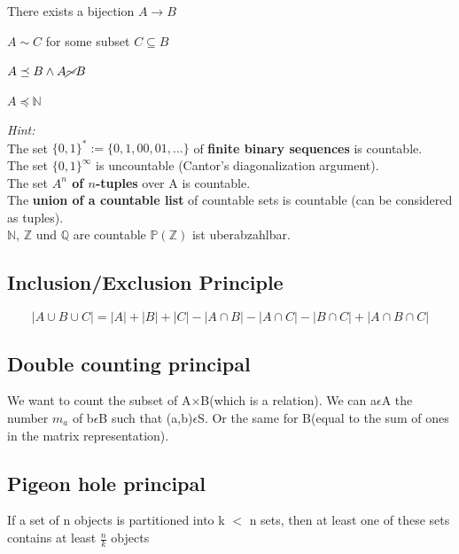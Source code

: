 \documentclass[11pt]{article}
\begin{document}
\begin{description}[labelindent=16pt,style=multiline,leftmargin=9cm, noitemsep]
	\item[same cardinality $A \sim B$:] There exists a bijection $A \rightarrow B$
	\item[B has at least the cardinality of A $A \preceq B$:] $A \sim C$ for some subset $C \subseteq B$
	\item[B dominates A $A \prec B$:] $A \preceq B \land A \cancel{\sim} B$
	\item[countable:] $A \preceq \mathbb{N}$
\end{description}

\emph{Hint:} \\
The set $\{0,1\}^* := \{0,1, 00, 01, ...\}$ of \textbf{finite binary sequences} is countable. \\
The set $\{0,1\}^\infty$ is uncountable (Cantor's diagonalization argument). \\
The set \textbf{$A^n$ of $n$-tuples} over A is countable. \\
The \textbf{union of a countable list} of countable sets is countable (can be considered as  tuples).\\
$\mathbb{N}$, $\mathbb{Z}$ und $\mathbb{Q}$ are countable $\mathbb{P}(\mathbb{Z})$ ist uberabzahlbar.

\subsection{Inclusion/Exclusion Principle}

\begin{equation*}
	|A \cup B \cup C| = |A| + |B| + |C| - |A\cap B| - |A\cap C| - |B\cap C| + |A\cap B\cap C|
\end{equation*}

\subsection{Double counting principal}
We want to count the subset of A$\times$B(which is a relation). We can a$\epsilon$A the number $m_a$ of b$\epsilon$B such that (a,b)$\epsilon$S. Or the same for B(equal to the sum of ones in the matrix representation).

\subsection{Pigeon hole principal}
If a set of n objects is partitioned into k $<$ n sets, then at least one of these sets contains at least $\frac{n}{k}$ objects
\end{document}
